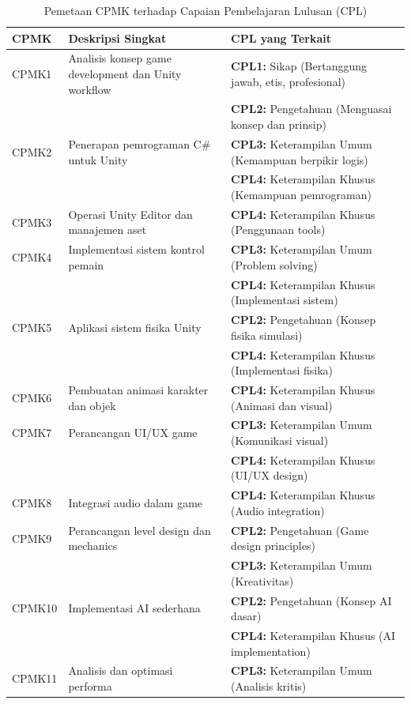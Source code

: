 \documentclass[a4paper,12pt]{article}
\begin{document}
\begin{table}[h]
\centering
\caption{Pemetaan CPMK terhadap Capaian Pembelajaran Lulusan (CPL)}
\label{tab:pemetaan_cpl}
\small
\begin{tabular}{|p{1.5cm}|p{7cm}|p{6cm}|}
\hline
\textbf{CPMK} & \textbf{Deskripsi Singkat} & \textbf{CPL yang Terkait} \\
\hline
CPMK1 & Analisis konsep game development dan Unity workflow & \textbf{CPL1:} Sikap (Bertanggung jawab, etis, profesional) \\
 & & \textbf{CPL2:} Pengetahuan (Menguasai konsep dan prinsip) \\
\hline
CPMK2 & Penerapan pemrograman C\# untuk Unity & \textbf{CPL3:} Keterampilan Umum (Kemampuan berpikir logis) \\
 & & \textbf{CPL4:} Keterampilan Khusus (Kemampuan pemrograman) \\
\hline
CPMK3 & Operasi Unity Editor dan manajemen aset & \textbf{CPL4:} Keterampilan Khusus (Penggunaan tools) \\
\hline
CPMK4 & Implementasi sistem kontrol pemain & \textbf{CPL3:} Keterampilan Umum (Problem solving) \\
 & & \textbf{CPL4:} Keterampilan Khusus (Implementasi sistem) \\
\hline
CPMK5 & Aplikasi sistem fisika Unity & \textbf{CPL2:} Pengetahuan (Konsep fisika simulasi) \\
 & & \textbf{CPL4:} Keterampilan Khusus (Implementasi fisika) \\
\hline
CPMK6 & Pembuatan animasi karakter dan objek & \textbf{CPL4:} Keterampilan Khusus (Animasi dan visual) \\
\hline
CPMK7 & Perancangan UI/UX game & \textbf{CPL3:} Keterampilan Umum (Komunikasi visual) \\
 & & \textbf{CPL4:} Keterampilan Khusus (UI/UX design) \\
\hline
CPMK8 & Integrasi audio dalam game & \textbf{CPL4:} Keterampilan Khusus (Audio integration) \\
\hline
CPMK9 & Perancangan level design dan mechanics & \textbf{CPL2:} Pengetahuan (Game design principles) \\
 & & \textbf{CPL3:} Keterampilan Umum (Kreativitas) \\
\hline
CPMK10 & Implementasi AI sederhana & \textbf{CPL2:} Pengetahuan (Konsep AI dasar) \\
 & & \textbf{CPL4:} Keterampilan Khusus (AI implementation) \\
\hline
CPMK11 & Analisis dan optimasi performa & \textbf{CPL3:} Keterampilan Umum (Analisis kritis) \\

\end{tabular}
\end{table}
\end{document}
